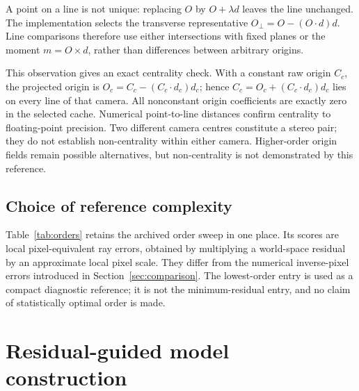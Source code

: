 \documentclass[10pt,a4paper]{article}
\begin{document}
A point on a line is not unique: replacing $O$ by $O+\lambda d$ leaves the line unchanged. The implementation selects the transverse representative $O_\perp=O-(O\cdot d)d$. Line comparisons therefore use either intersections with fixed planes or the moment $m=O\times d$, rather than differences between arbitrary origins.

This observation gives an exact centrality check. With a constant raw origin $C_c$, the projected origin is $O_c=C_c-(C_c\cdot d_c)d_c$; hence $C_c=O_c+(C_c\cdot d_c)d_c$ lies on every line of that camera. All nonconstant origin coefficients are exactly zero in the selected cache. Numerical point-to-line distances confirm centrality to floating-point precision. Two different camera centres constitute a stereo pair; they do not establish non-centrality within either camera. Higher-order origin fields remain possible alternatives, but non-centrality is not demonstrated by this reference.

\subsection{Choice of reference complexity}
Table~\ref{tab:orders} retains the archived order sweep in one place. Its scores are local pixel-equivalent ray errors, obtained by multiplying a world-space residual by an approximate local pixel scale. They differ from the numerical inverse-pixel errors introduced in Section~\ref{sec:comparison}. The lowest-order entry is used as a compact diagnostic reference; it is not the minimum-residual entry, and no claim of statistically optimal order is made.

\begin{table}[htbp]\centering
\caption{Archived order sweep. Total coefficients include the 15 pose variables. The last column is a local pixel-equivalent RMS, not numerical reprojection. These historical fits were not rerun for the present comparison.}\label{tab:orders}

\end{table}

\section{Residual-guided model construction}\label{sec:method}
\end{document}
